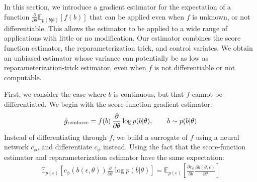 \documentclass{article}
\newcommand{\E}{\mathbb{E}}
\newcommand{\PT}{\frac{\partial}{\partial \theta}}
\newcommand{\YW}[1]{{\color{red} \bf [[YW: #1]]}}
\newcommand{\LAX}{{\textnormal{LAX}}}
\begin{document}
In this section, we introduce a gradient estimator for the expectation of a function $\PT \E_{p(b|\theta)}[f(b)]$ that can be applied even when $f$ is unknown, or not differentiable.
This allows the estimator to be applied to a wide range of applications with little or no modification.
Our estimator combines the score function estimator, the reparameterization trick, and control variates.
We obtain an unbiased estimator whose variance can potentially be as low as reparameterization-trick estimator, even when $f$ is not differentiable or not computable.


First, we consider the case where $b$ is continuous, but that $f$ cannot be differentiated.
We begin with the score-function gradient estimator:
%
\begin{align}
\hat g_\textnormal{reinforce} = f \! \left( b \right) \PT \log p(b | \theta), \qquad b \sim p(b|\theta)
\end{align}
%
Instead of differentiating through $f$, we build a surrogate of $f$ using a neural network $c_\phi$, and differentiate $c_\phi$ instead.
Using the fact that the score-function estimator and reparameterization estimator have the same expectation:
%
\begin{align}
\E_{p(\epsilon)} \left[ c_\phi ( b(\epsilon, \theta)) \PT \log p(b | \theta) \right] =
\E_{p(\epsilon)} \left[ \frac{\partial c_\phi}{\partial b} \frac{\partial b(\theta, \epsilon)}{\partial \theta} \right]
\end{align}
%
%
%
\end{document}
